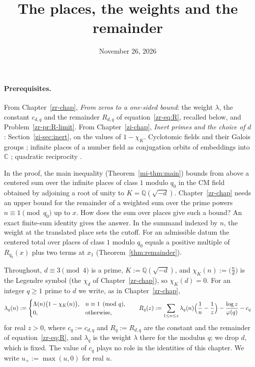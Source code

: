 \documentclass[reqno]{amsart}
\title{The places, the weights and the remainder}
\author{}
\date{November 26, 2026}
\newcounter{chap}
\theoremstyle{definition}
\theoremstyle{plain}
\newcommand{\Q}{\mathbb{Q}}
\newcommand{\C}{\mathbb{C}}
\begin{document}
\maketitle
{}\label{chap}

\paragraph{Prerequisites.}
From Chapter~\ref{zr-chap}, \emph{From zeros to a one-sided bound}: the weight \(\lambda\), the constant \(c_{d,q}\) and the remainder \(R_{d,q}\) of equation~\eqref{zr-eq:R}, recalled below, and Problem~\ref{zr-pr:R-limit}.  From Chapter~\ref{zi-chap}, \emph{Inert primes and the choice of \(d\)}: Section~\ref{zi-sec:inert}, on the values of \(1 - \chi_K\).  Cyclotomic fields and their Galois groups \cite[Ch.~2]{Wa}; infinite places of a number field as conjugation orbits of embeddings into \(\C\) \cite[Ch.~II, \S8]{Ne}; quadratic reciprocity \cite[Ch.~I, \S3]{SeA}.

\medskip
In the proof, the main inequality (Theorem~\ref{mi-thm:main}) bounds from above a centered sum over the infinite places of class \(1\) modulo \(q_0\) in the CM field obtained by adjoining a root of unity to \(K = \Q(\sqrt{-d})\).  Chapter~\ref{zr-chap} needs an upper bound for the remainder of a weighted sum over the prime powers \(n \equiv 1 \pmod{q_0}\) up to \(x\).  How does the sum over places give such a bound?  An exact finite-sum identity gives the answer.  In the summand indexed by \(n\), the weight at the translated place sets the cutoff.  For an admissible datum the centered total over places of class \(1\) modulo \(q_0\) equals a positive multiple of \(R_{q_0}(x)\) plus two terms at \(x_1\) (Theorem~\ref{thm:remainder}).

Throughout, \(d \equiv 3 \pmod 4\) is a prime, \(K := \Q(\sqrt{-d})\), and \(\chi_K(n) := \bigl(\frac nd\bigr)\) is the Legendre symbol (the \(\chi_d\) of Chapter~\ref{zr-chap}), so \(\chi_K(d) = 0\).  For an integer \(q \ge 1\) prime to \(d\) we write, as in Chapter~\ref{zr-chap},
\[
  \lambda_q(n) := \begin{cases} \Lambda(n)\bigl(1 - \chi_K(n)\bigr), & n \equiv 1 \pmod q, \\ 0, & \text{otherwise}, \end{cases}
  \qquad
  R_q(z) := \sum_{1 \le n \le z} \lambda_q(n) \Bigl(\frac1n - \frac1z\Bigr) - \frac{\log z}{\varphi(q)} - c_q
\]
for real \(z > 0\), where \(c_q := c_{d,q}\) and \(R_q := R_{d,q}\) are the constant and the remainder of equation~\eqref{zr-eq:R}, and \(\lambda_q\) is the weight \(\lambda\) there for the modulus \(q\); we drop \(d\), which is fixed.  The value of \(c_q\) plays no role in the identities of this chapter.  We write \(u_+ := \max(u, 0)\) for real \(u\).
\end{document}
